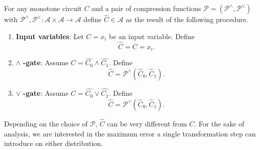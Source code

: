 
\begin{definition}
\label{def:approximation}
    For any monotone circuit $C$ and a pair of compression  functions $\mathcal{P} = (\mathcal{P}^\wedge, \mathcal{P}^\vee)$ with $\mathcal{P}^\wedge, \mathcal{P}^\vee: \mathcal{A} \times \mathcal{A} \rightarrow \mathcal{A}$ define $\hat{C} \in \mathcal{A}$ as the result of the following procedure.
    \begin{enumerate}
        \item \textbf{Input variables}: Let $C=x_i$ be an input variable. Define 
        \begin{equation*}
            \hat{C} = C = x_i.
        \end{equation*}
        \item {$\wedge$ \textbf{-gate}}: Assume $C = \hat{C_0} \wedge \hat{C_1}$. Define
        \begin{equation*}
            \hat{C} = \mathcal{P}^\wedge(\hat{C}_0, \hat{C}_1).
        \end{equation*}
        \item {$\vee$ \textbf{-gate}}: Assume $C = \hat{C_0} \vee \hat{C_1}$. Define 
        \begin{equation*}
            \hat{C} = \mathcal{P}^\vee(\hat{C}_0, \hat{C}_1).
        \end{equation*}
    \end{enumerate}
\end{definition}

Depending on the choice of $\mathcal{P}$, $\hat{C}$ can be very different from $C$. For the sake of analysis, we are interested in the maximum error a single transformation step can introduce on either distribution.

